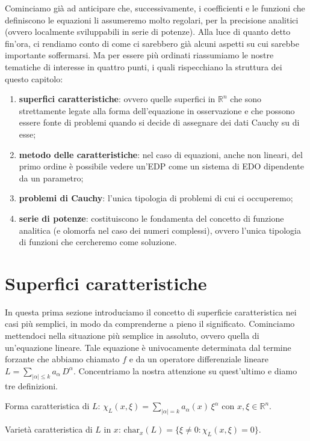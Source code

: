 Cominciamo già ad anticipare che, successivamente, i coefficienti e le funzioni che definiscono le equazioni li assumeremo molto regolari, per la precisione analitici (ovvero localmente sviluppabili in serie di potenze).
\newpage
Alla luce di quanto detto fin'ora, ci rendiamo conto di come ci sarebbero già alcuni aspetti su cui sarebbe importante soffermarsi.
Ma per essere più ordinati riassumiamo le nostre tematiche di interesse in quattro punti, i quali rispecchiano la struttura dei questo capitolo:
\begin{enumerate}
\item \textbf{superfici caratteristiche}: ovvero quelle superfici in $\mathbb{R}^n$ che sono strettamente legate alla forma dell'equazione in osservazione e che possono essere fonte di problemi quando si decide di assegnare dei dati Cauchy su di esse;
\item \textbf{metodo delle caratteristiche}: nel caso di equazioni, anche non lineari, del primo ordine è possibile vedere un'EDP come un sistema di EDO dipendente da un parametro;
\item \textbf{problemi di Cauchy}: l'unica tipologia di problemi di cui ci occuperemo;
\item \textbf{serie di potenze}: costituiscono le fondamenta del concetto di funzione analitica (e olomorfa nel caso dei numeri complessi), ovvero l'unica tipologia di funzioni che cercheremo come soluzione. 
\end{enumerate}


\section{Superfici caratteristiche} \label{supcar}
In questa prima sezione introduciamo il concetto di superficie caratteristica nei casi più semplici, in modo da comprenderne a pieno il significato. Cominciamo mettendoci nella situazione più semplice in assoluto, ovvero quella di un'equazione lineare. 
Tale equazione è univocamente determinata dal termine forzante che abbiamo chiamato $f$ e da un operatore differenziale lineare $L=\sum_{|\alpha |\leq k} a_\alpha \, D^\alpha$. Concentriamo la nostra attenzione su quest'ultimo e diamo tre definizioni.

\begin{definition}
Forma caratteristica di $L$:  $\chi_L(x,\xi)=\sum_{|\alpha |= k} a_\alpha(x) \, \xi^\alpha$ con  $x,\xi \in \mathbb{R}^n$.
\end{definition}

\begin{definition}
Varietà caratteristica di $L$ in $x$: $\text{char}_x (L)= \{ \xi \neq 0 : \chi_L(x,\xi)=0 \}$.
\end{definition}

